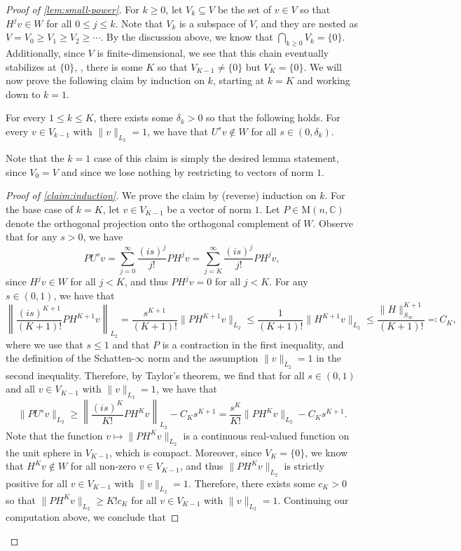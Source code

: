\documentclass{toc}
\theoremstyle{plain}
\numberwithin{equation}{section}
\theoremstyle{definition}
\newcommand{\bC}{\mathbb{C}}
\newcommand{\bnorm}[1]{\left\lVert#1\right\rVert}
\newcommand{\norm}[1]{\lVert#1\rVert}
\newcommand{\M}{\mathrm{M}}
\begin{document}
\begin{proof}[Proof of \cref{lem:small-power}]
    For $k \geq 0$, let $V_k \subseteq V$ be the set of $v \in V$ so that $H^j v \in W$ for all $0 \leq j \leq k$. Note that $V_k$ is a subspace of $V$, and they are nested as $V=V_0 \geq V_1 \geq V_2 \geq \dotsb$. By the discussion above, we know that $\bigcap_{k \geq 0} V_k = \{0\}$. Additionally, since $V$ is finite-dimensional, we see that this chain eventually stabilizes at $\{0\}$, \ie, there is some $K$ so that $V_{K-1} \neq \{0\}$ but $V_{K}=\{0\}$. We will now prove the following claim by induction on $k$, starting at $k=K$ and working down to $k=1$.
    \begin{claim}\label{claim:induction}
        For every $1 \leq k \leq K$, there exists some $\delta_k>0$ so that the following holds. For every $v \in V_{k-1}$ with $\norm{v}_{L_2}=1$, we have that $U^s v \notin W$ for all $s \in (0,\delta_k)$.
    \end{claim}
    Note that the $k=1$ case of this claim is simply the desired lemma statement, since $V_0=V$ and since we lose nothing by restricting to vectors of norm $1$.
    \begin{proof}[Proof of \cref{claim:induction}]
        We prove the claim by (reverse) induction on $k$. For the base case of $k=K$, let $v \in V_{K-1}$ be a vector of norm $1$. Let $P\in\M(n,\bC)$ denote the orthogonal projection onto the orthogonal complement of $W$. Observe that for any $s>0$, we have
        \[
            P U^s v = \sum_{j=0}^\infty \frac{(is)^j}{j!} PH^j v = \sum_{j=K}^\infty \frac{(is)^j}{j!} PH^j v,
        \]
        since $H^jv \in W$ for all $j<K$, and thus $PH^j v =0$ for all $j <K$. For any $s \in (0,1)$, we have that
        \[
            \bnorm{\frac{(is)^{K+1}}{(K+1)!} PH^{K+1}v}_{L_2} = \frac{s^{K+1}}{(K+1)!} \norm{PH^{K+1}v}_{L_2} \leq \frac{1}{(K+1)!} \norm{H^{K+1}v}_{L_2} \leq \frac{\norm H_{S_{\infty}}^{K+1}}{(K+1)!}\eqqcolon C_K,
        \]
        where we use that $s \leq 1$ and that $P$ is a contraction in the first inequality, and the definition of the Schatten-$\infty$ norm and the assumption $\norm{v}_{L_2}=1$ in the second inequality. Therefore, by Taylor's theorem, we find that for all $s \in (0,1)$ and all $v \in V_{K-1}$ with $\norm{v}_{L_2}=1$, we have that
        \[
            \norm{PU^s v}_{L_2} \geq \bnorm{\frac{(is)^K}{K!} PH^K v}_{L_2} - C_K s^{K+1} = \frac{s^K}{K!} \norm{PH^K v}_{L_2} - C_K s^{K+1}.
        \]
        Note that the function $v \mapsto \norm{PH^K v}_{L_2}$ is a continuous real-valued function on the unit sphere in $V_{K-1}$, which is compact. Moreover, since $V_K=\{0\}$, we know that $H^K v \notin W$ for all non-zero $v \in V_{K-1}$, and thus $\norm{PH^K v}_{L_2}$ is strictly positive for all $v \in V_{K-1}$ with $\norm v_{L_2}=1$. Therefore, there exists some $c_K>0$ so that $\norm{PH^K v}_{L_2} \geq K! c_K$ for all $v \in V_{K-1}$ with $\norm v_{L_2}=1$. Continuing our computation above, we conclude that


\end{proof}
\end{proof}
\end{document}
